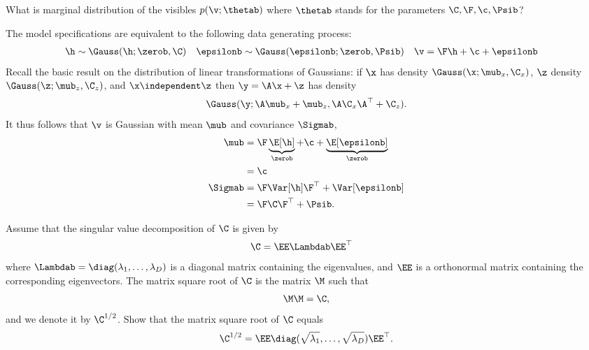 \begin{exenumerate}
  
\item What is marginal distribution of the visibles $p(\v; \thetab)$ where $\thetab$ stands for the parameters $\C, \F, \c, \Psib$?
   
  \begin{solution}
    The model specifications are equivalent to the following data generating process:
    \begin{align}
      \h &\sim \Gauss(\h; \zerob, \C) & \epsilonb &\sim \Gauss(\epsilonb; \zerob, \Psib) &  \v &= \F \h + \c + \epsilonb
    \end{align}
    Recall the basic result on the distribution of linear
    transformations of Gaussians: if $\x$ has density $\Gauss(\x;
    \mub_x, \C_x)$, $\z$ density $\Gauss(\z; \mub_z, \C_z)$, and $\x
    \independent \z$ then $\y = \A \x + \z$ has density
    $$\Gauss(\y; \A\mub_x+\mub_z, \A \C_x \A^\top + \C_z).$$
    It thus follows that $\v$ is Gaussian with mean $\mub$ and covariance $\Sigmab$,
    \begin{align}
      \mub &= \F \underbrace{\E[\h]}_{\zerob} + \c + \underbrace{\E[\epsilonb]}_{\zerob}\\
      & = \c\\
      \Sigmab &= \F \Var[\h] \F^\top + \Var[\epsilonb]\\
      & = \F \C \F^\top + \Psib.
    \end{align}


  \end{solution}
  
\item Assume that the singular value decomposition of $\C$ is given by
  \begin{align}
    \C & = \EE \Lambdab \EE^\top
  \end{align}
  where $\Lambdab = \diag(\lambda_1, \ldots, \lambda_D)$ is a diagonal
  matrix containing the eigenvalues, and $\EE$ is a orthonormal matrix
  containing the corresponding eigenvectors. The matrix square root of $\C$ is the matrix $\M$ such that
  \begin{align}
    \M \M = \C,
  \end{align}
  and we denote it by $\C^{1/2}$. Show that the matrix square root of
  $\C$ equals
  \begin{align}
    \C^{1/2} = \EE \diag(\sqrt{\lambda_1}, \ldots, \sqrt{\lambda_D}) \EE^\top.
  \end{align}
  

\end{exenumerate}
